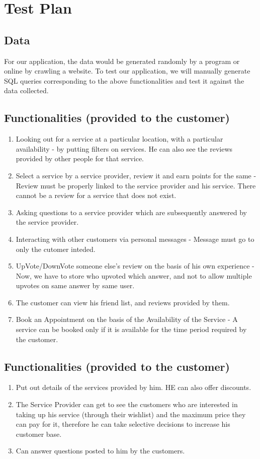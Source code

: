 \documentclass[a4paper]{article}
\begin{document}
\section{Test Plan}

\subsection{Data}
For our application, the data would be generated randomly by a program or online by crawling a website. To test our application, we will manually generate SQL queries corresponding to the above functionalities and test it against the data collected.

\subsection{Functionalities (provided to the customer)}
\begin{enumerate}
\item Looking out for a service at a particular location, with a particular availability - by putting filters on services. He can also see the reviews provided by other people for that service.
\item Select a service by a service provider, review it and earn points for the same - Review must be properly linked to the service provider and his service. There cannot be a review for a service that does not exist.
\item Asking questions to a service provider which are subsequently answered by the service provider.
\item Interacting with other customers via personal messages - Message must go to only the cutomer inteded.
\item UpVote/DownVote someone else's review on the basis of his own experience - Now, we have to store who upvoted which answer, and not to allow multiple upvotes on same answer by same user.
\item The customer can view his friend list, and reviews provided by them.
\item Book an Appointment on the basis of the Availability of the Service - A service can be booked only if it is available for the time period required by the customer.
\end{enumerate}

\subsection{Functionalities (provided to the customer)}
\begin{enumerate}
\item Put out details of the services provided by him. HE can also offer discounts.
\item The Service Provider can get to see the customers who are interested in taking up his service (through their wishlist) and the maximum price they can pay for it, therefore he can take selective decisions to increase his customer base.
\item Can answer questions posted to him by the customers.
\end{enumerate}
\end{document}
